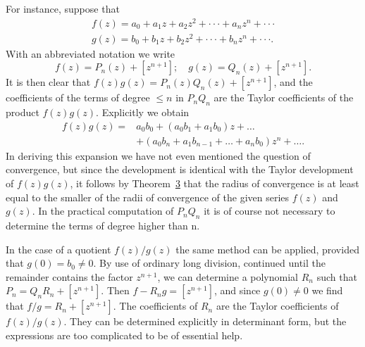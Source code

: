 For instance, suppose that
\begin{equation*}
\begin{array}{l} f (z) = a _ {0} + a _ {1} z + a _ {2} z ^ {2} + \cdot \cdot \cdot + a _ {n} z ^ {n} + \cdot \cdot \cdot \\ g (z) = b _ {0} + b _ {1} z + b _ {2} z ^ {2} + \cdot \cdot \cdot + b _ {n} z ^ {n} + \cdot \cdot \cdot . \end{array}
\end{equation*}
With an abbreviated notation we write
\begin{equation*}
f (z) = P _ {n} (z) + [ z ^ {n + 1} ]; \quad g (z) = Q _ {n} (z) + [ z ^ {n + 1} ].
\end{equation*}
It is then clear that $f(z)g(z) = P_{n}(z)Q_{n}(z) + [z^{n+1}]$, and the coefficients of the terms of degree $\leq n$ in $P_{n}Q_{n}$ are the Taylor coefficients of the product $f(z)g(z)$. Explicitly we obtain
\begin{equation*}
\begin{aligned}
f(z)g(z)={}&a_0b_0+(a_0b_1+a_1b_0)z+\dots\\
&+(a_0b_n+a_1b_{n-1}+\dots+a_nb_0)z^n+\dots.
\end{aligned}
\end{equation*}
In deriving this expansion we have not even mentioned the question of convergence, but since the development is identical with the Taylor development of $f(z)g(z)$, it follows by Theorem~\hyperref[thm:5.3]{3} that the radius of convergence is at least equal to the smaller of the radii of convergence of the given series $f(z)$ and $g(z)$. In the practical computation of $P_{n}Q_{n}$ it is of course not necessary to determine the terms of degree higher than n.

In the case of a quotient $f(z)/g(z)$ the same method can be applied, provided that $g(0)=b_{0}\neq0$. By use of ordinary long division, continued until the remainder contains the factor $z^{n+1}$, we can determine a polynomial $R_{n}$ such that $P_{n}=Q_{n}R_{n}+[z^{n+1}]$. Then $f-R_{n}g=[z^{n+1}]$, and since $g(0)\neq0$ we find that $f/g=R_{n}+[z^{n+1}]$. The coefficients of $R_{n}$ are the Taylor coefficients of $f(z)/g(z)$. They can be determined explicitly in determinant form, but the expressions are too complicated to be of essential help.

